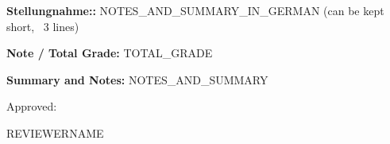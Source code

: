 \documentclass{scrartcl}
\begin{document}
\textbf{Stellungnahme::} NOTES\_AND\_SUMMARY\_IN\_GERMAN (can be kept short, ~3 lines)

\vspace{0.5cm}
\textbf{Note / Total Grade:} TOTAL\_GRADE


\vspace{0.5cm}
\textbf{Summary and Notes:} NOTES\_AND\_SUMMARY

\vspace{0.5cm}
Approved: \hrulefill

\hspace*{0mm}\phantom{Approved: } REVIEWERNAME
\end{document}
